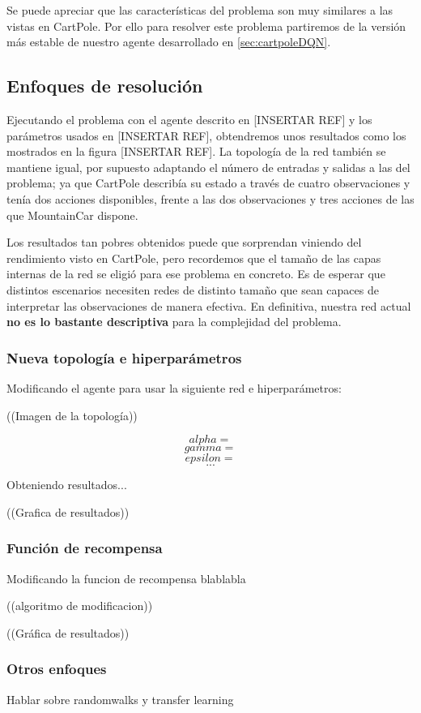 Se puede apreciar que las características del problema son muy similares a las vistas en CartPole. Por ello para resolver este problema partiremos de la versión más estable de nuestro agente desarrollado en \ref{sec:cartpoleDQN}.


\subsection{Enfoques de resolución}

Ejecutando el problema con el agente descrito en [INSERTAR REF] y los parámetros usados en [INSERTAR REF], obtendremos unos resultados como los mostrados en la figura [INSERTAR REF]. La topología de la red también se mantiene igual, por supuesto adaptando el número de entradas y salidas a las del problema; ya que CartPole describía su estado a través de cuatro observaciones y tenía dos acciones disponibles, frente a las dos observaciones y tres acciones de las que MountainCar dispone.

Los resultados tan pobres obtenidos puede que sorprendan viniendo del rendimiento visto en CartPole, pero recordemos que el tamaño de las capas internas de la red se eligió para ese problema en concreto. Es de esperar que distintos escenarios necesiten redes de distinto tamaño que sean capaces de interpretar las observaciones de manera efectiva. En definitiva, nuestra red actual \textbf{no es lo bastante descriptiva} para la complejidad del problema.

\subsubsection*{Nueva topología e hiperparámetros}
Modificando el agente para usar la siguiente red e hiperparámetros:

((Imagen de la topología))

$$ alpha = $$
$$ gamma = $$
$$ epsilon = $$
$$ ... $$

Obteniendo resultados... 

((Grafica de resultados))

\subsubsection*{Función de recompensa}
Modificando la funcion de recompensa blablabla

((algoritmo de modificacion))

((Gráfica de resultados))

\subsubsection*{Otros enfoques}
Hablar sobre randomwalks y transfer learning